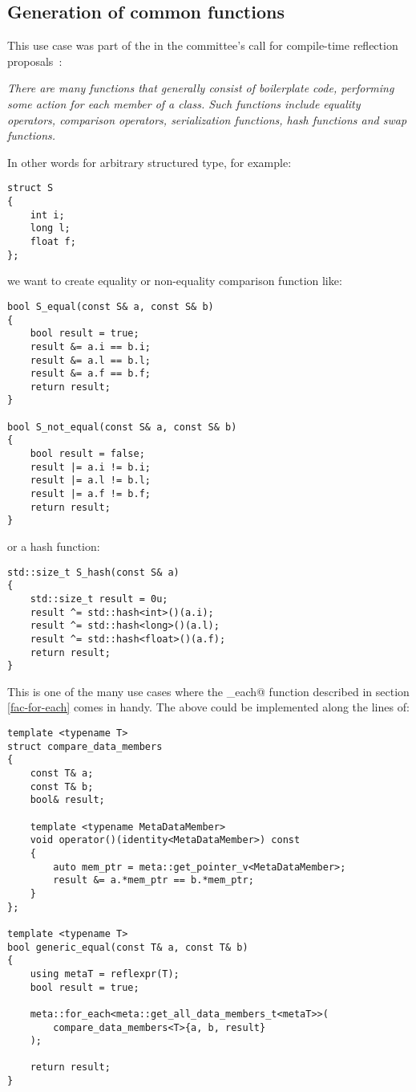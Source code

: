 \subsection{Generation of common functions}
\label{use-case-common-func}

This use case was part of the  in the committee's
call for compile-time reflection proposals~\cite{ISOCPP-N3814}: 

{\em There are many functions that generally consist of boilerplate code,
performing some action for each member of a class. Such functions include
equality operators, comparison operators, serialization functions,
hash functions and swap functions.
}

In other words for arbitrary structured type, for example:

\begin{verbatim}
struct S
{
	int i;
	long l;
	float f;
};
\end{verbatim}

we want to create equality or non-equality comparison function like:

\begin{verbatim}
bool S_equal(const S& a, const S& b)
{
	bool result = true;
	result &= a.i == b.i;
	result &= a.l == b.l;
	result &= a.f == b.f;
	return result;
}

bool S_not_equal(const S& a, const S& b)
{
	bool result = false;
	result |= a.i != b.i;
	result |= a.l != b.l;
	result |= a.f != b.f;
	return result;
}
\end{verbatim}

or a hash function:

\begin{verbatim}
std::size_t S_hash(const S& a)
{
	std::size_t result = 0u;
	result ^= std::hash<int>()(a.i);
	result ^= std::hash<long>()(a.l);
	result ^= std::hash<float>()(a.f);
	return result;
}
\end{verbatim}

This is one of the many use cases where the \verb@for_each@ function
described in section \ref{fac-for-each} comes in handy. The above could be
implemented along the lines of:

\begin{verbatim}
template <typename T>
struct compare_data_members
{
	const T& a;
	const T& b;
	bool& result;

	template <typename MetaDataMember>
	void operator()(identity<MetaDataMember>) const
	{
		auto mem_ptr = meta::get_pointer_v<MetaDataMember>;
		result &= a.*mem_ptr == b.*mem_ptr;
	}
};

template <typename T>
bool generic_equal(const T& a, const T& b)
{
	using metaT = reflexpr(T);
	bool result = true;

	meta::for_each<meta::get_all_data_members_t<metaT>>(
		compare_data_members<T>{a, b, result}
	);

	return result;
}
\end{verbatim}

